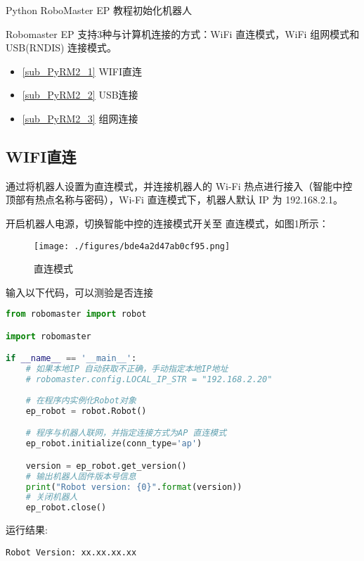 
Python RoboMaster EP 教程初始化机器人


Robomaster EP 支持3种与计算机连接的方式：WiFi 直连模式，WiFi 组网模式和 USB(RNDIS) 连接模式。

\begin{itemize}
\item \autoref{sub_PyRM2_1} WIFI直连
\item \autoref{sub_PyRM2_2} USB连接
\item \autoref{sub_PyRM2_3} 组网连接
\end{itemize}

\subsection{WIFI直连}\label{sub_PyRM2_1}

通过将机器人设置为直连模式，并连接机器人的 Wi-Fi 热点进行接入（智能中控顶部有热点名称与密码），Wi-Fi 直连模式下，机器人默认 IP 为 192.168.2.1。

开启机器人电源，切换智能中控的连接模式开关至 直连模式，如图1所示：

\begin{figure}[ht]
\centering
\texttt{[image: ./figures/bde4a2d47ab0cf95.png]}
\caption{直连模式} \label{fig_PyRM2_1}
\end{figure}

输入以下代码，可以测验是否连接

\begin{lstlisting}[language=python]
from robomaster import robot

import robomaster

if __name__ == '__main__':
    # 如果本地IP 自动获取不正确，手动指定本地IP地址
    # robomaster.config.LOCAL_IP_STR = "192.168.2.20"
    
    # 在程序内实例化Robot对象
    ep_robot = robot.Robot()

    # 程序与机器人联网，并指定连接方式为AP 直连模式
    ep_robot.initialize(conn_type='ap')

    version = ep_robot.get_version()
    # 输出机器人固件版本号信息
    print("Robot version: {0}".format(version))
    # 关闭机器人
    ep_robot.close()
\end{lstlisting}

运行结果:
\begin{lstlisting}[language=pythonC]
Robot Version: xx.xx.xx.xx
\end{lstlisting}


